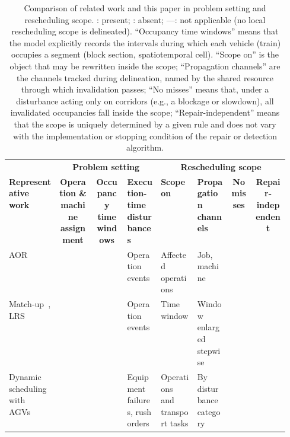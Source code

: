 \documentclass[manuscript,screen,review]{acmart}
\newcommand{\cmark}{\ding{51}}
\newcommand{\xmark}{\ding{55}}
\begin{document}
\begin{table}[t]
\centering
\caption{Comparison of related work and this paper in problem setting and rescheduling scope.
\cmark: present; \xmark: absent; ---: not applicable (no local rescheduling scope is delineated).
``Occupancy time windows'' means that the model explicitly records the intervals during which each vehicle (train) occupies a segment (block section, spatiotemporal cell).
``Scope on'' is the object that may be rewritten inside the scope;
``Propagation channels'' are the channels tracked during delineation, named by the shared resource through which invalidation passes;
``No misses'' means that, under a disturbance acting only on corridors (e.g., a blockage or slowdown), all invalidated occupancies fall inside the scope;
``Repair-independent'' means that the scope is uniquely determined by a given rule and does not vary with the implementation or stopping condition of the repair or detection algorithm.}
\label{tab:position}
\footnotesize
\setlength{\tabcolsep}{3pt}
\begin{tabular}{@{}>{\raggedright\arraybackslash}p{0.18\linewidth}cc>{\raggedright\arraybackslash}p{0.12\linewidth}>{\raggedright\arraybackslash}p{0.13\linewidth}>{\raggedright\arraybackslash}p{0.12\linewidth}cc@{}}
\toprule
& \multicolumn{3}{c}{\textbf{Problem setting}} & \multicolumn{4}{c}{\textbf{Rescheduling scope}} \\
\cmidrule(lr){2-4}\cmidrule(l){5-8}
\textbf{Representative work} &
\makecell{\textbf{Operation \&}\\\textbf{machine}\\\textbf{assignment}} &
\makecell{\textbf{Occupancy}\\\textbf{time}\\\textbf{windows}} &
\textbf{Execution-time disturbances} &
\textbf{Scope on} &
\textbf{Propagation channels} &
\makecell{\textbf{No}\\\textbf{misses}} &
\makecell{\textbf{Repair-}\\\textbf{independent}} \\
\midrule
AOR~\cite{subramaniam2003maor} &
\cmark & \xmark & Operation events & Affected operations & Job, machine & \xmark & \cmark \\
Match-up~\cite{qiao2012single,salido2017rescheduling}, LRS~\cite{kuster2007local} &
\cmark & \xmark & Operation events & Time window & Window enlarged stepwise & \xmark & \xmark \\
Dynamic scheduling with AGVs~\cite{zhang2023energy,tang2026dynamic} &
\cmark & \xmark & Equipment failures, rush orders & Operations and transport tasks & By disturbance category & \xmark & \cmark \\

\end{tabular}
\end{table}
\end{document}
